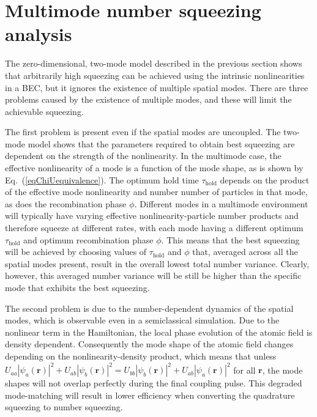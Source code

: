 \documentclass{iopart}
\begin{document}
\section{Multimode number squeezing analysis} \label{sec:MMdescription}

The zero-dimensional, two-mode model described in the previous section shows that arbitrarily high squeezing can be achieved using the intrinsic nonlinearities in a BEC, but it ignores the existence of multiple spatial modes.  There are three problems caused by the existence of multiple modes, and these will limit the achievable squeezing.

The first problem is present even if the spatial modes are uncoupled.  The two-mode model shows that the parameters required to obtain best squeezing are dependent on the strength of the nonlinearity. In the multimode case, the effective nonlinearity of a mode is a function of the mode shape, as is shown by Eq.~(\ref{eqChiUequivalence}). The optimum hold time $\tau_{\mathrm{hold}}$ depends on the product of the effective mode nonlinearity and number number of particles in that mode, as does the recombination phase $\phi$.  Different modes in a multimode environment will typically have varying effective nonlinearity-particle number products and therefore squeeze at different rates, with each mode having a different optimum $\tau_{\mathrm{hold}}$ and optimum recombination phase $\phi$. This means that the best squeezing will be achieved by choosing values of $\tau_{\mathrm{hold}}$ and $\phi$ that, averaged across all the spatial modes present, result in the overall lowest total number variance. Clearly, however, this averaged number variance will be still be higher than the specific mode that exhibits the best squeezing.

The second problem is due to the number-dependent dynamics of the spatial modes, which is observable even in a semiclassical simulation.  Due to the nonlinear term in the Hamiltonian, the local phase evolution of the atomic field is density dependent.  Consequently the mode shape of the atomic field changes depending on the nonlinearity-density product, which means that unless $U_{aa}|\psi_a({\mathbf{r}})|^2 + U_{ab}|\psi_b({\mathbf{r}})|^2 = U_{bb}|\psi_b({\mathbf{r}})|^2 + U_{ab}|\psi_a({\mathbf{r}})|^2$ for all ${\mathbf{r}}$, the mode shapes will not overlap perfectly during the final coupling pulse. This degraded mode-matching will result in lower efficiency when converting the quadrature squeezing to number squeezing. 
\end{document}
